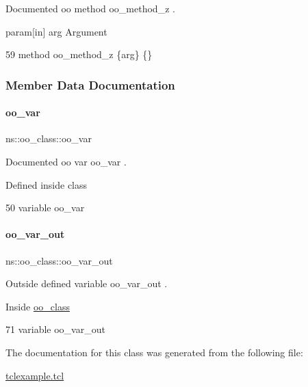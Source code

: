 Documented oo method {\ttfamily oo\+\_\+method\+\_\+z} . 

param\mbox{[}in\mbox{]} arg Argument 
\begin{DoxyCode}
59     \textcolor{keyword}{method} oo\_method\_z \{arg\} \{\}
\end{DoxyCode}


\subsubsection{Member Data Documentation}
\hypertarget{classns_1_1oo__class_a741f11f4a2db3876205658d4a9a279ba}{}\label{classns_1_1oo__class_a741f11f4a2db3876205658d4a9a279ba} 
\paragraph{\texorpdfstring{oo\+\_\+var}{oo\_var}}
{\footnotesize\ttfamily ns\+::oo\+\_\+class\+::oo\+\_\+var\hspace{0.3cm}{\ttfamily [static]}}



Documented oo var {\ttfamily oo\+\_\+var} . 

Defined inside class 
\begin{DoxyCode}
50     \textcolor{keyword}{variable} oo\_var
\end{DoxyCode}
\hypertarget{classns_1_1oo__class_af46293ede16067c38ca2901416cad8ee}{}\label{classns_1_1oo__class_af46293ede16067c38ca2901416cad8ee} 
\paragraph{\texorpdfstring{oo\+\_\+var\+\_\+out}{oo\_var\_out}}
{\footnotesize\ttfamily ns\+::oo\+\_\+class\+::oo\+\_\+var\+\_\+out\hspace{0.3cm}{\ttfamily [static]}}



Outside defined variable {\ttfamily oo\+\_\+var\+\_\+out} . 

Inside \hyperlink{classns_1_1oo__class}{oo\+\_\+class} 
\begin{DoxyCode}
71   \textcolor{keyword}{variable} oo\_var\_out
\end{DoxyCode}


The documentation for this class was generated from the following file\+:\begin{DoxyCompactItemize}
\item 
\hyperlink{tclexample_8tcl}{tclexample.\+tcl}\end{DoxyCompactItemize}
